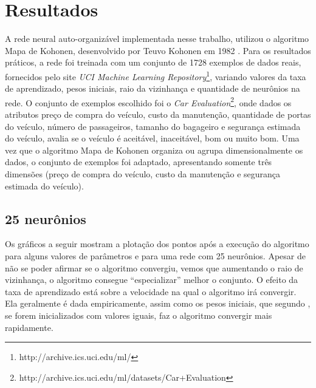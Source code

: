 \section{Resultados}
A rede neural auto-organizável implementada nesse trabalho, utilizou o algoritmo Mapa de Kohonen, desenvolvido por
Teuvo Kohonen em 1982 \cite{}. Para os resultados práticos, a rede foi treinada com um conjunto de 1728 exemplos de dados 
reais, fornecidos pelo site \textit{UCI Machine Learning Repository}\footnote{http://archive.ics.uci.edu/ml/}, variando
valores da taxa de aprendizado, pesos iniciais, raio da vizinhança e quantidade de neurônios na rede. O conjunto de exemplos 
escolhido foi o \textit{Car Evaluation}\footnote{http://archive.ics.uci.edu/ml/datasets/Car+Evaluation}, onde dados os 
atributos preço de compra do veículo, custo da manutenção, quantidade de portas do veículo, número de passageiros, tamanho do
bagageiro e segurança estimada do veículo, avalia se o veículo é aceitável, inaceitável, bom ou muito bom. Uma vez que o 
algoritmo Mapa de Kohonen organiza ou agrupa dimensionalmente os dados, o conjunto de exemplos foi adaptado, 
apresentando somente três dimensões (preço de compra do veículo, custo da manutenção e segurança estimada do veículo).

\subsection{25 neurônios}
Os gráficos a seguir mostram a plotação dos pontos após a execução do algoritmo para alguns valores de parâmetros e para 
uma rede com 25 neurônios. Apesar de não se poder afirmar se o algoritmo convergiu, vemos que aumentando o raio de vizinhança,
o algoritmo consegue ``especializar'' melhor o conjunto. O efeito da taxa de aprendizado está sobre a velocidade na qual o 
algoritmo irá convergir. Ela geralmente é dada empiricamente, assim como os pesos iniciais, que segundo \cite{}, se forem
inicializados com valores iguais, faz o algoritmo convergir mais rapidamente.

